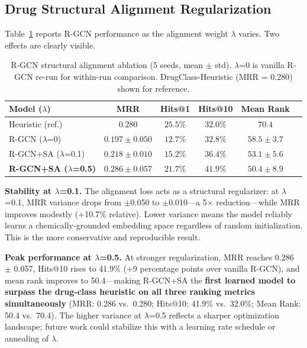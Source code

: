 \documentclass[conference]{IEEEtran}
\begin{document}
\subsection{Drug Structural Alignment Regularization}
\label{sec:structalign_results}

Table~\ref{tab:structalign} reports R-GCN performance as the alignment weight $\lambda$ varies. Two effects are clearly visible.

\begin{table}[h]
\centering
\caption{R-GCN structural alignment ablation (5 seeds, mean $\pm$ std). $\lambda$=0 is vanilla R-GCN re-run for within-run comparison. DrugClass-Heuristic (MRR = 0.280) shown for reference.}
\label{tab:structalign}
\begin{tabular}{lccccc}
\toprule
\textbf{Model ($\lambda$)} & \textbf{MRR} & \textbf{Hits@1} & \textbf{Hits@10} & \textbf{Mean Rank} \\
\midrule
Heuristic (ref.)          & $0.280$           & $25.5\%$ & $32.0\%$ & $70.4$ \\
\midrule
R-GCN ($\lambda$=0)       & $0.197 \pm 0.050$ & $12.7\%$ & $32.8\%$ & $58.5 \pm 3.7$ \\
R-GCN+SA ($\lambda$=0.1)  & $0.218 \pm 0.010$ & $15.2\%$ & $36.4\%$ & $53.1 \pm 5.6$ \\
\textbf{R-GCN+SA ($\lambda$=0.5)}  & $\mathbf{0.286 \pm 0.057}$ & $\mathbf{21.7\%}$ & $\mathbf{41.9\%}$ & $\mathbf{50.4 \pm 8.9}$ \\
\bottomrule
\end{tabular}
\end{table}

\textbf{Stability at $\lambda$=0.1.} The alignment loss acts as a structural regularizer: at $\lambda$=0.1, MRR variance drops from $\pm$0.050 to $\pm$0.010---a 5$\times$ reduction---while MRR improves modestly (+10.7\% relative). Lower variance means the model reliably learns a chemically-grounded embedding space regardless of random initialization. This is the more conservative and reproducible result.

\textbf{Peak performance at $\lambda$=0.5.} At stronger regularization, MRR reaches 0.286 $\pm$ 0.057, Hits@10 rises to 41.9\% (+9 percentage points over vanilla R-GCN), and mean rank improves to 50.4---making R-GCN+SA the \textbf{first learned model to surpass the drug-class heuristic on all three ranking metrics simultaneously} (MRR: 0.286 vs.\ 0.280; Hits@10: 41.9\% vs.\ 32.0\%; Mean Rank: 50.4 vs.\ 70.4). The higher variance at $\lambda$=0.5 reflects a sharper optimization landscape; future work could stabilize this with a learning rate schedule or annealing of $\lambda$.
\end{document}
